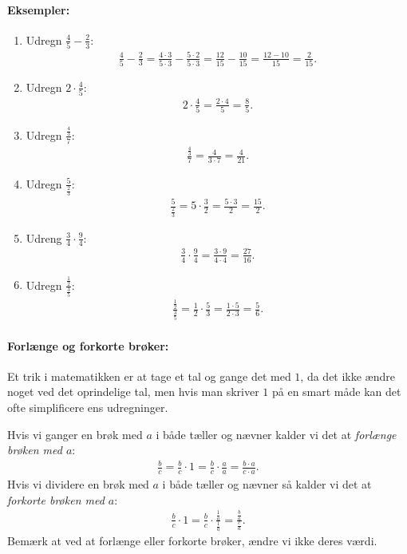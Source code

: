 \paragraph*{Eksempler:}
\begin{enumerate}
\item Udregn $\frac{4}{5}-\frac{2}{3}$:
\begin{align*}
\frac{4}{5}-\frac{2}{3} = \frac{4\cdot 3}{5 \cdot 3} - \frac{5 \cdot 2}{5 \cdot 3} = \frac{12}{15} - \frac{10}{15} = \frac{12-10}{15} = \frac{2}{15}.
\end{align*}
\item Udregn $2 \cdot \frac{4}{5}$:
\begin{align*}
2 \cdot \frac{4}{5}= \frac{2 \cdot 4}{5} = \frac{8}{5}.
\end{align*}
\item Udregn $\frac{\frac{4}{3}}{7}$:
\begin{align*}
\frac{\frac{4}{3}}{7} = \frac{4}{3 \cdot 7} = \frac{4}{21}.
\end{align*}
\item Udregn $\frac{5}{\frac{2}{3}}$:
\begin{align*}
\frac{5}{\frac{2}{3}} = 5 \cdot \frac{3}{2} = \frac{5 \cdot 3}{2} = \frac{15}{2}.
\end{align*}
\item Udreng $\frac{3}{4} \cdot \frac{9}{4}$:
\begin{align*}
\frac{3}{4} \cdot \frac{9}{4} = \frac{3 \cdot 9}{4 \cdot 4} = \frac{27}{16}.
\end{align*}
\item  Udregn $\frac{\frac{1}{2}}{\frac{3}{5}}$:
\begin{align*}
\frac{\frac{1}{2}}{\frac{3}{5}} = \frac{1}{2} \cdot \frac{5}{3} = \frac{1 \cdot 5}{2 \cdot 3} = \frac{5}{6}.
\end{align*}
\end{enumerate}

\paragraph*{Forlænge og forkorte brøker:}
Et trik i matematikken er at tage et tal og gange det med $1$, da det ikke ændre noget ved det oprindelige tal, men hvis man skriver $1$ på en smart måde kan det ofte simplificere ens udregninger. 

Hvis vi ganger en brøk med $a$ i både tæller og nævner kalder vi det at \emph{forlænge brøken med $a$}:
\begin{align*}
\frac{b}{c} = \frac{b}{c} \cdot 1 = \frac{b}{c} \cdot \frac{a}{a} = \frac{b \cdot a}{c \cdot a}.
\end{align*}
Hvis vi dividere en brøk med $a$ i både tæller og nævner så kalder vi det at \emph{forkorte brøken med $a$}:
\begin{align*}
\frac{b}{c} \cdot 1 = \frac{b}{c} \cdot \frac{\frac{1}{a}}{\frac{1}{a}} = \frac{\frac{b}{a}}{\frac{c}{a}}. 
\end{align*}
Bemærk at ved at forlænge eller forkorte brøker, ændre vi ikke deres værdi.
